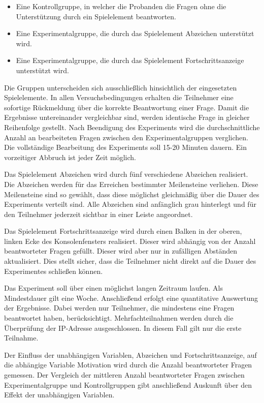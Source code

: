 \documentclass[
    a4paper,
    doc,
    12pt,
    natbib,
]{apa6}
\begin{document}
\begin{itemize}
\item Eine Kontrollgruppe, in welcher die Probanden die Fragen ohne die Unterstützung durch ein Spielelement beantworten. 
\item  Eine Experimentalgruppe, die durch das Spielelement Abzeichen unterstützt wird.
\item  Eine Experimentalgruppe, die durch das Spielelement Fortschrittsanzeige unterstützt wird. 
\end{itemize}

Die Gruppen unterscheiden sich ausschließlich hinsichtlich der eingesetzten Spielelemente.
In allen Versuchsbedingungen erhalten die Teilnehmer eine sofortige Rückmeldung über die korrekte Beantwortung einer Frage. Damit die Ergebnisse untereinander vergleichbar sind, werden identische Frage in gleicher Reihenfolge gestellt.
Nach Beendigung des Experiments wird die durchschnittliche Anzahl an  bearbeiteten Fragen zwischen den Experimentalgruppen verglichen. Die vollständige Bearbeitung des Experiments soll 15-20 Minuten dauern. Ein vorzeitiger Abbruch ist jeder Zeit möglich.

Das Spielelement Abzeichen wird durch fünf verschiedene Abzeichen realisiert. Die Abzeichen werden für das Erreichen bestimmter Meilensteine verliehen. Diese Meilensteine sind so gewählt, dass diese möglichst gleichmäßig über die Dauer des Experiments verteilt sind. Alle Abzeichen sind anfänglich grau hinterlegt und für den Teilnehmer jederzeit sichtbar in einer Leiste angeordnet.

Das Spielelement Fortschrittsanzeige wird durch einen Balken in der oberen, linken Ecke des Konsolenfensters realisiert. Dieser wird abhängig von der Anzahl beantworteter Fragen gefüllt. Dieser wird aber nur in zufälligen Abständen aktualisiert. Dies stellt sicher, dass die Teilnehmer nicht direkt auf die Dauer des Experimentes schließen können.

Das Experiment soll über einen möglichst langen Zeitraum laufen. Als Mindestdauer gilt eine Woche. Anschließend erfolgt eine quantitative Auswertung der Ergebnisse. Dabei werden nur Teilnehmer, die mindestens eine Fragen beantwortet haben, berücksichtigt. Mehrfachteilnahmen werden durch die Überprüfung der IP-Adresse ausgeschlossen. In diesem Fall gilt nur die erste Teilnahme. 

Der Einfluss der unabhängigen Variablen, Abzeichen und Fortschrittsanzeige, auf die abhängige Variable Motivation wird durch die Anzahl beantworteter Fragen gemessen. Der Vergleich der mittleren Anzahl beantworteter Fragen zwischen Experimentalgruppe und Kontrollgruppen gibt anschließend Auskunft über den Effekt der unabhängigen Variablen.
\end{document}
